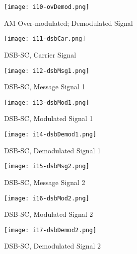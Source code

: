 \begin{figure}[H]
    \centering
    \texttt{[image: i10-ovDemod.png]}
    \caption{AM Over-modulated; Demodulated Signal}
    \label{fig:img10}
\end{figure}

\begin{figure}[H]
    \centering
    \texttt{[image: i11-dsbCar.png]}
    \caption{DSB-SC, Carrier Signal}
    \label{fig:img11}
\end{figure}

\begin{figure}[H]
    \centering
    \texttt{[image: i12-dsbMsg1.png]}
    \caption{DSB-SC, Message Signal 1}
    \label{fig:img12}
\end{figure}

\begin{figure}[H]
    \centering
    \texttt{[image: i13-dsbMod1.png]}
    \caption{DSB-SC, Modulated Signal 1}
    \label{fig:img13}
\end{figure}

\begin{figure}[H]
    \centering
    \texttt{[image: i14-dsbDemod1.png]}
    \caption{DSB-SC, Demodulated Signal 1}
    \label{fig:img14}
\end{figure}

\begin{figure}[H]
    \centering
    \texttt{[image: i15-dsbMsg2.png]}
    \caption{DSB-SC, Message Signal 2}
    \label{fig:img15}
\end{figure}

\begin{figure}[H]
    \centering
    \texttt{[image: i16-dsbMod2.png]}
    \caption{DSB-SC, Modulated Signal 2}
    \label{fig:img16}
\end{figure}

\begin{figure}[H]
    \centering
    \texttt{[image: i17-dsbDemod2.png]}
    \caption{DSB-SC, Demodulated Signal 2}
    \label{fig:img17}
\end{figure}
